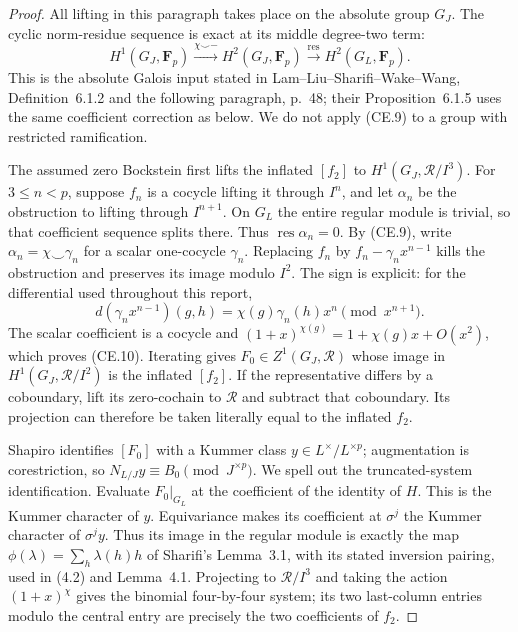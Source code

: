 \documentclass[11pt,a4paper]{article}
\theoremstyle{definition}
\begin{document}
\begin{proof}
All lifting in this paragraph takes place on the absolute
group \(G_J\).  The cyclic norm-residue sequence is exact at
its middle degree-two term:
\[
 H^1(G_J,\mathbf F_p)
 \xrightarrow{\chi\smile-}H^2(G_J,\mathbf F_p)
 \xrightarrow{\operatorname{res}}H^2(G_L,\mathbf F_p).
                                                        \tag{CE.9}
\]
This is the absolute Galois input stated in
Lam--Liu--Sharifi--Wake--Wang, Definition~6.1.2 and the
following paragraph, p.~48; their Proposition~6.1.5 uses
the same coefficient correction as below.  We do not
apply (CE.9) to a group with restricted ramification.

The assumed zero Bockstein first lifts the inflated
\([f_2]\) to \(H^1(G_J,\mathcal R/I^3)\).
For \(3\le n<p\), suppose \(f_n\) is a cocycle lifting it
through \(I^n\), and let \(\alpha_n\) be the obstruction
to lifting through \(I^{n+1}\).  On \(G_L\) the entire
regular module is trivial, so that coefficient sequence
splits there.  Thus \(\operatorname{res}\alpha_n=0\).
By (CE.9), write \(\alpha_n=\chi\smile\gamma_n\)
for a scalar one-cocycle \(\gamma_n\).
Replacing \(f_n\) by \(f_n-\gamma_n x^{n-1}\)
kills the obstruction and preserves its image modulo
\(I^2\).  The sign is explicit: for the differential used
throughout this report,
\[
 d(\gamma_n x^{n-1})(g,h)
       =\chi(g)\gamma_n(h)x^n\pmod{x^{n+1}}.
                                                       \tag{CE.10}
\]
The scalar coefficient is a cocycle and
\((1+x)^{\chi(g)}=1+\chi(g)x+O(x^2)\), which proves
(CE.10).  Iterating gives
\(F_0\in Z^1(G_J,\mathcal R)\) whose image in
\(H^1(G_J,\mathcal R/I^2)\) is the inflated \([f_2]\).
If the representative differs by a coboundary, lift
its zero-cochain to \(\mathcal R\) and subtract that
coboundary.  Its projection can therefore be taken
literally equal to the inflated \(f_2\).

Shapiro identifies \([F_0]\) with a Kummer class
\(y\in L^\times/L^{\times p}\); augmentation is
corestriction, so \(N_{L/J}y\equiv B_0\pmod{J^{\times p}}\).
We spell out the truncated-system identification.
Evaluate \(F_0|_{G_L}\) at the coefficient of the
identity of \(H\).  This is the Kummer character of
\(y\).  Equivariance makes its coefficient at
\(\sigma^j\) the Kummer character of \(\sigma^j y\).
Thus its image in the regular module is
exactly the map \(\phi(\lambda)=\sum_h\lambda(h)h\)
of Sharifi's Lemma~3.1, with its stated inversion
pairing, used in (4.2) and Lemma~4.1.
Projecting to \(\mathcal R/I^3\) and taking the action
\((1+x)^\chi\) gives the binomial four-by-four system;
its two last-column entries modulo the central entry
are precisely the two coefficients of \(f_2\).


\end{proof}
\end{document}
